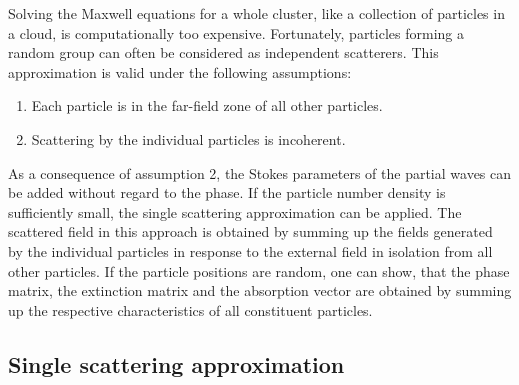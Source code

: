 Solving the Maxwell equations for a whole cluster, like a collection
of particles in a cloud, is computationally too expensive.
Fortunately, particles forming a random group can often be considered
as independent scatterers. This approximation is valid under the
following assumptions:
\begin{enumerate}
\item Each particle is in the far-field zone of all other particles.
\item Scattering by the individual particles is incoherent.
\end{enumerate}

As a consequence of assumption 2, the Stokes parameters of the partial
waves can be added without regard to the phase. If the particle number
density is sufficiently small, the single scattering approximation can
be applied. The scattered field in this approach is obtained by
summing up the fields generated by the individual particles in
response to the external field in isolation from all other particles.
If the particle positions are random, one can show, that the phase
matrix, the extinction matrix and the absorption vector are obtained
by summing up the respective characteristics of all constituent
particles.

\subsection{Single scattering approximation}

